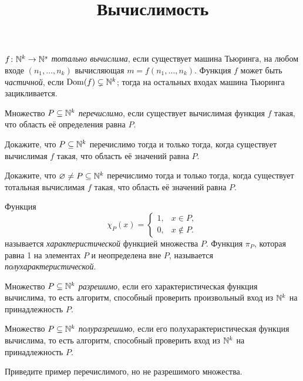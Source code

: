 \documentclass[a4paper, 12pt, num=ТА2]{listok}
\DeclareMathOperator{\Dom}{Dom}
\begin{document}
\title{Вычислимость}
\maketitle
\begin{definition}
	$f \colon \mathbb{N}^k \to \mathbb{N}^s$ \textit{тотально вычислима}, если существует машина Тьюринга,
	на любом входе $(n_1 , \dots, n_k)$ вычисляющая $m = f (n_1, \dots, n_k)$.
	Функция $f$ может быть \textit{частичной}, если $\Dom(f) \subsetneq \N^k$; тогда на остальных входах машина Тьюринга зацикливается.
\end{definition}
\begin{definition}
	Множество $P \subseteq \mathbb{N}^k$ \textit{перечислимо},
	если существует вычислимая функция $f$ такая, что область её определения равна $P$.
\end{definition}
\begin{problem}[\point]
	Докажите, что $P \subseteq \mathbb{N}^k$ перечислимо тогда и только тогда,
	когда существует вычислимая $f$ такая, что область её значений равна $P$.
\end{problem}
\begin{problem}[\point]
	Докажите, что $\varnothing \ne P \subseteq \mathbb{N}^k$ перечислимо тогда и только тогда,
	когда существует тотальная вычислимая $f$ такая, что область её значений равна $P$.
\end{problem}
\begin{definition}
	Функция
	\[
		\chi_P(x) = \left \{ \begin{aligned}
				1, & x \in P,\\
				0, & x \notin P.
				\end{aligned} \right .
	\]
	называется \textit{характеристической} функцией множества $P$.
	Функция $\pi_P$, которая равна 1 на элементах $P$ и неопределена вне $P$, называется \textit{полухарактеристической}.
\end{definition}
\begin{definition}
	Множество $P \subseteq \mathbb{N}^k$ \textit{разрешимо}, если его характеристическая функция вычислима,
	то есть алгоритм, способный проверить произвольный вход из $\mathbb{N}^k$ на принадлежность $P$.
\end{definition}
\begin{definition}
	Множество $P \subseteq \mathbb{N}^k$ \textit{полуразрешимо}, если его полухарактеристическая функция вычислима,
	то есть алгоритм, способный проверить вход из $\mathbb{N}^k$ на принадлежность $P$.
\end{definition}
\begin{problem}[\point]
	Приведите пример перечислимого, но не разрешимого множества.
\end{problem}
\end{document}
